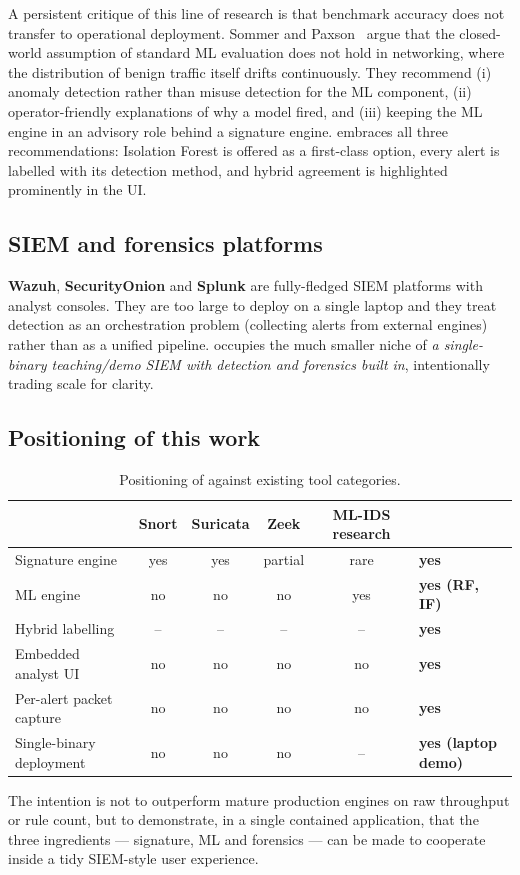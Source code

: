 A persistent critique of this line of research is that benchmark
accuracy does not transfer to operational deployment. Sommer and
Paxson~\cite{sommer2010outside} argue that the closed-world assumption
of standard ML evaluation does not hold in networking, where the
distribution of benign traffic itself drifts continuously. They
recommend (i) anomaly detection rather than misuse detection for the ML
component, (ii) operator-friendly explanations of why a model fired, and
(iii) keeping the ML engine in an advisory role behind a signature
engine. \nidsname{} embraces all three recommendations: Isolation Forest
is offered as a first-class option, every alert is labelled with its
detection method, and hybrid agreement is highlighted prominently in the
UI.

\subsection{SIEM and forensics platforms}

\textbf{Wazuh}, \textbf{SecurityOnion} and \textbf{Splunk} are
fully-fledged SIEM platforms with analyst consoles. They are too large
to deploy on a single laptop and they treat detection as an
orchestration problem (collecting alerts from external engines) rather
than as a unified pipeline. \nidsname{} occupies the much smaller niche
of \textit{a single-binary teaching/demo SIEM with detection and
forensics built in}, intentionally trading scale for clarity.

\subsection{Positioning of this work}

\begin{table}[h]
\centering
\small
\begin{tabularx}{\textwidth}{l c c c c X}
\toprule
& Snort & Suricata & Zeek & ML-IDS research & \textbf{\nidsname{}} \\
\midrule
Signature engine            & yes & yes & partial & rare & \textbf{yes} \\
ML engine                   & no  & no  & no      & yes & \textbf{yes (RF, IF)} \\
Hybrid labelling            & --  & --  & --      & --  & \textbf{yes} \\
Embedded analyst UI         & no  & no  & no      & no  & \textbf{yes} \\
Per-alert packet capture    & no  & no  & no      & no  & \textbf{yes} \\
Single-binary deployment    & no  & no  & no      & --  & \textbf{yes (laptop demo)} \\
\bottomrule
\end{tabularx}
\caption{Positioning of \nidsname{} against existing tool categories.}
\label{tab:positioning}
\end{table}

The intention is not to outperform mature production engines on raw
throughput or rule count, but to demonstrate, in a single contained
application, that the three ingredients --- signature, ML and forensics
--- can be made to cooperate inside a tidy SIEM-style user experience.
